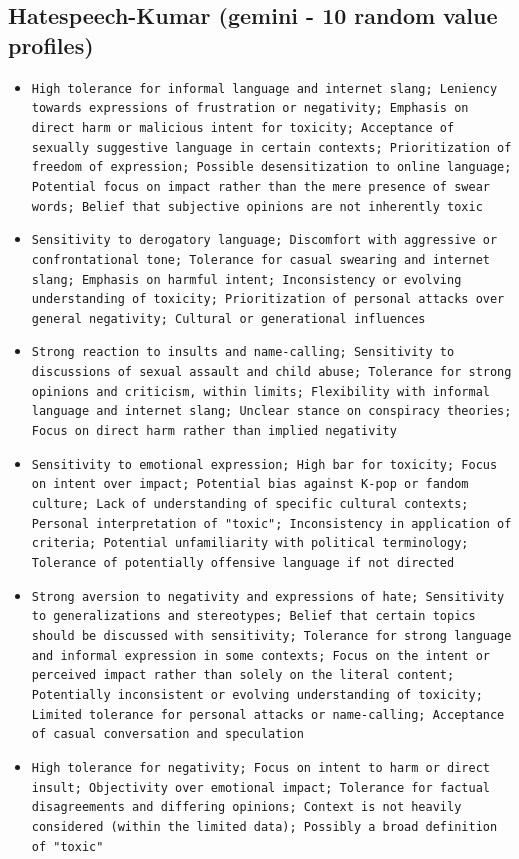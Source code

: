 \documentclass[11pt]{article}
\begin{document}
\subsection{Hatespeech-Kumar (gemini - 10 random value profiles)}
\begin{itemize}
\item \texttt{High tolerance for informal language and internet slang; Leniency towards expressions of frustration or negativity; Emphasis on direct harm or malicious intent for toxicity; Acceptance of sexually suggestive language in certain contexts; Prioritization of freedom of expression; Possible desensitization to online language; Potential focus on impact rather than the mere presence of swear words; Belief that subjective opinions are not inherently toxic}
\item \texttt{Sensitivity to derogatory language; Discomfort with aggressive or confrontational tone; Tolerance for casual swearing and internet slang; Emphasis on harmful intent; Inconsistency or evolving understanding of toxicity; Prioritization of personal attacks over general negativity; Cultural or generational influences}
\item \texttt{Strong reaction to insults and name-calling; Sensitivity to discussions of sexual assault and child abuse; Tolerance for strong opinions and criticism, within limits; Flexibility with informal language and internet slang; Unclear stance on conspiracy theories; Focus on direct harm rather than implied negativity}
\item \texttt{Sensitivity to emotional expression; High bar for toxicity; Focus on intent over impact; Potential bias against K-pop or fandom culture; Lack of understanding of specific cultural contexts; Personal interpretation of "toxic"; Inconsistency in application of criteria; Potential unfamiliarity with political terminology; Tolerance of potentially offensive language if not directed}
\item \texttt{Strong aversion to negativity and expressions of hate; Sensitivity to generalizations and stereotypes; Belief that certain topics should be discussed with sensitivity; Tolerance for strong language and informal expression in some contexts; Focus on the intent or perceived impact rather than solely on the literal content; Potentially inconsistent or evolving understanding of toxicity; Limited tolerance for personal attacks or name-calling; Acceptance of casual conversation and speculation}
\item \texttt{High tolerance for negativity; Focus on intent to harm or direct insult; Objectivity over emotional impact; Tolerance for factual disagreements and differing opinions; Context is not heavily considered (within the limited data); Possibly a broad definition of "toxic"}

\end{itemize}
\end{document}
